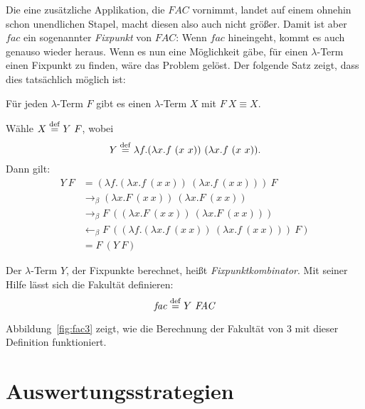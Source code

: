 Die eine zusätzliche Applikation, die $\mathit{FAC}$ vornimmt, landet
auf einem ohnehin schon unendlichen Stapel,
macht diesen also auch nicht größer.  Damit ist aber $\mathit{fac}$ ein sogenannter
\textit{Fixpunkt} von $\mathit{FAC}$:  Wenn $\mathit{fac}$
hineingeht, kommt es auch genauso wieder heraus.  Wenn es nun eine
Möglichkeit gäbe, für einen $\lambda$-Term einen Fixpunkt zu finden,
wäre das Problem gelöst.  Der folgende Satz zeigt, dass dies tatsächlich
möglich ist:
%
\begin{satz}[Fixpunktsatz]
  \label{satz:fixpunkt}
  Für jeden $\lambda$-Term $F$ gibt es einen $\lambda$-Term $X$ mit
  $F~X\equiv X$.
\end{satz}
\begin{beweis}
  Wähle $X \stackrel{\rm def}{=}{} Y~F$, wobei
  \begin{displaymath}
    Y \stackrel{\rm def}{=}{} \lambda f.(\lambda x.f~(x~x))~(\lambda x.f~(x~x)).
  \end{displaymath}
  Dann gilt:
  \begin{displaymath}
    \begin{split}
      Y~F & = (\lambda f.(\lambda x.f~(x~x))~(\lambda x.f~(x~x)))~F
      \\ & \rightarrow_\beta
      (\lambda x.F~(x~x))~(\lambda x.F~(x~x))
      \\ & \rightarrow_\beta
      F~((\lambda x.F~(x~x))~(\lambda x.F~(x~x)))
      \\ & \leftarrow_\beta
      F~((\lambda f.(\lambda x.f~(x~x))~(\lambda x.f~(x~x)))~F)
      \\ & =
      F~(Y~F)
    \end{split}
  \end{displaymath}
\end{beweis}
%
Der $\lambda$-Term $Y$, der Fixpunkte
berechnet, heißt
\textit{Fixpunktkombinator}.  Mit seiner Hilfe lässt sich
die Fakultät definieren:
%
\begin{displaymath}
  \mathit{fac} \stackrel{\rm def}{=}{} Y~\mathit{FAC}
\end{displaymath}
%

Abbildung~\ref{fig:fac3} zeigt, wie die Berechnung der Fakultät von
$3$ mit dieser Definition funktioniert.

\section{Auswertungsstrategien}
\label{sec:lambda-evaluation-strategies}

